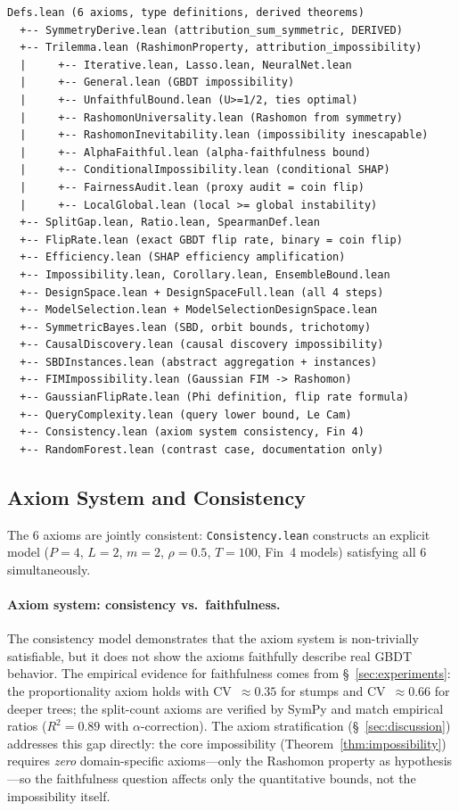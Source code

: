 \documentclass{jmlr}
\begin{document}
{\small
\begin{verbatim}
Defs.lean (6 axioms, type definitions, derived theorems)
  +-- SymmetryDerive.lean (attribution_sum_symmetric, DERIVED)
  +-- Trilemma.lean (RashimonProperty, attribution_impossibility)
  |     +-- Iterative.lean, Lasso.lean, NeuralNet.lean
  |     +-- General.lean (GBDT impossibility)
  |     +-- UnfaithfulBound.lean (U>=1/2, ties optimal)
  |     +-- RashomonUniversality.lean (Rashomon from symmetry)
  |     +-- RashomonInevitability.lean (impossibility inescapable)
  |     +-- AlphaFaithful.lean (alpha-faithfulness bound)
  |     +-- ConditionalImpossibility.lean (conditional SHAP)
  |     +-- FairnessAudit.lean (proxy audit = coin flip)
  |     +-- LocalGlobal.lean (local >= global instability)
  +-- SplitGap.lean, Ratio.lean, SpearmanDef.lean
  +-- FlipRate.lean (exact GBDT flip rate, binary = coin flip)
  +-- Efficiency.lean (SHAP efficiency amplification)
  +-- Impossibility.lean, Corollary.lean, EnsembleBound.lean
  +-- DesignSpace.lean + DesignSpaceFull.lean (all 4 steps)
  +-- ModelSelection.lean + ModelSelectionDesignSpace.lean
  +-- SymmetricBayes.lean (SBD, orbit bounds, trichotomy)
  +-- CausalDiscovery.lean (causal discovery impossibility)
  +-- SBDInstances.lean (abstract aggregation + instances)
  +-- FIMImpossibility.lean (Gaussian FIM -> Rashomon)
  +-- GaussianFlipRate.lean (Phi definition, flip rate formula)
  +-- QueryComplexity.lean (query lower bound, Le Cam)
  +-- Consistency.lean (axiom system consistency, Fin 4)
  +-- RandomForest.lean (contrast case, documentation only)
\end{verbatim}
}

\subsection{Axiom System and Consistency}

The 6 axioms are jointly consistent: \texttt{Consistency.lean} constructs an explicit model ($P{=}4$, $L{=}2$, $m{=}2$, $\rho{=}0.5$, $T{=}100$, Fin~4 models) satisfying all 6 simultaneously.

\paragraph{Axiom system: consistency vs.\ faithfulness.}
The consistency model demonstrates that the axiom system is non-trivially satisfiable, but it does not show the axioms faithfully describe real GBDT behavior. The empirical evidence for faithfulness comes from \S~\ref{sec:experiments}: the proportionality axiom holds with CV~$\approx 0.35$ for stumps and CV~$\approx 0.66$ for deeper trees; the split-count axioms are verified by SymPy and match empirical ratios ($R^2 = 0.89$ with $\alpha$-correction). The axiom stratification (\S~\ref{sec:discussion}) addresses this gap directly: the core impossibility (Theorem~\ref{thm:impossibility}) requires \emph{zero} domain-specific axioms---only the Rashomon property as hypothesis---so the faithfulness question affects only the quantitative bounds, not the impossibility itself.
\end{document}
